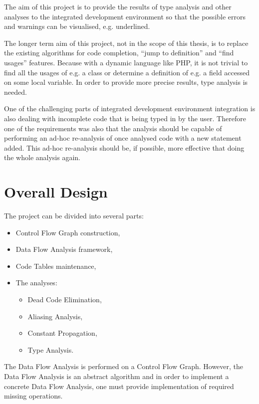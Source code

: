     The aim of this project is to provide the results of type analysis 
    and other analyses to the integrated development environment so 
    that the possible errors and warnings can be visualised, e.g. underlined.
    
    The longer term aim of this project, not in the scope of this thesis, 
    is to replace the existing algorithms for code completion, 
    ``jump to definition'' and ``find usages'' features. Because 
    with a dynamic language like PHP, it is not trivial to 
    find all the usages of e.g. a class or determine 
    a definition of e.g. a field accessed on some local variable. 
    In order to provide more precise results, 
    type analysis is needed.
    
    One of the challenging parts of integrated development 
    environment integration is also dealing with incomplete code 
    that is being typed in by the user. Therefore one of the requirements 
    was also that the analysis should be capable of 
    performing an ad-hoc re-analysis of once analysed 
    code with a new statement added. This ad-hoc re-analysis 
    should be, if possible, more effective that doing the 
    whole analysis again.
    
    \section{Overall Design}
    The project can be divided into several parts:
    \begin{itemize}
        \item Control Flow Graph construction,
        \item Data Flow Analysis framework, 
        \item Code Tables maintenance, 
        \item The analyses:
        \begin{itemize}
            \item Dead Code Elimination, 
            \item Aliasing Analysis, 
            \item Constant Propagation,
            \item Type Analysis.
        \end{itemize}
    \end{itemize}
    
    The Data Flow Analysis is performed on a Control Flow Graph. 
    However, the Data Flow Analysis is an abstract algorithm and 
    in order to implement a concrete Data Flow Analysis, 
    one must provide implementation of required missing operations. 
    
